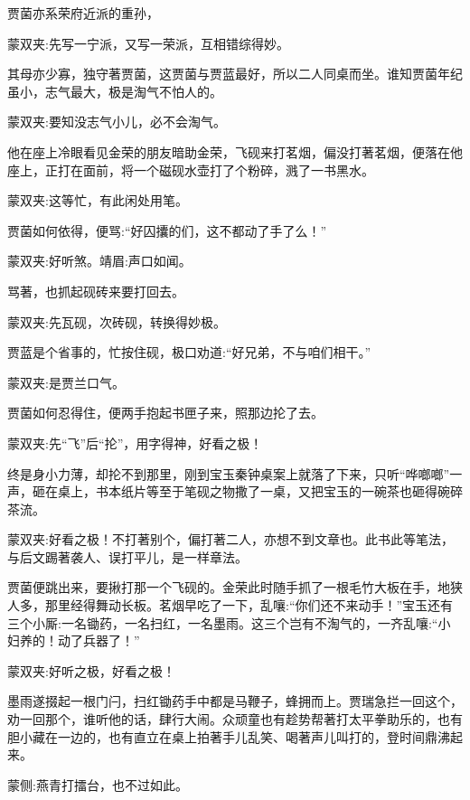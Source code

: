 \begin{parag}
    贾菌亦系荣府近派的重孙，\begin{note}蒙双夹:先写一宁派，又写一荣派，互相错综得妙。\end{note}其母亦少寡，独守著贾菌，这贾菌与贾蓝最好，所以二人同桌而坐。谁知贾菌年纪虽小，志气最大，极是淘气不怕人的。\begin{note}蒙双夹:要知没志气小儿，必不会淘气。\end{note}他在座上冷眼看见金荣的朋友暗助金荣，飞砚来打茗烟，偏没打著茗烟，便落在他座上，正打在面前，将一个磁砚水壶打了个粉碎，溅了一书黑水。\begin{note}蒙双夹:这等忙，有此闲处用笔。\end{note}贾菌如何依得，便骂:“好囚攮的们，这不都动了手了么！”\begin{note}蒙双夹:好听煞。靖眉:声口如闻。\end{note}骂著，也抓起砚砖来要打回去。\begin{note}蒙双夹:先瓦砚，次砖砚，转换得妙极。\end{note}贾蓝是个省事的，忙按住砚，极口劝道:“好兄弟，不与咱们相干。”\begin{note}蒙双夹:是贾兰口气。\end{note}贾菌如何忍得住，便两手抱起书匣子来，照那边抡了去。\begin{note}蒙双夹:先“飞”后“抡”，用字得神，好看之极！\end{note}终是身小力薄，却抡不到那里，刚到宝玉秦钟桌案上就落了下来，只听“哗啷啷”一声，砸在桌上，书本纸片等至于笔砚之物撒了一桌，又把宝玉的一碗茶也砸得碗碎茶流。\begin{note}蒙双夹:好看之极！不打著别个，偏打著二人，亦想不到文章也。此书此等笔法，与后文踢著袭人、误打平儿，是一样章法。\end{note}贾菌便跳出来，要揪打那一个飞砚的。金荣此时随手抓了一根毛竹大板在手，地狭人多，那里经得舞动长板。茗烟早吃了一下，乱嚷:“你们还不来动手！”宝玉还有三个小厮:一名锄药，一名扫红，一名墨雨。这三个岂有不淘气的，一齐乱嚷:“小妇养的！动了兵器了！”\begin{note}蒙双夹:好听之极，好看之极！\end{note}墨雨遂掇起一根门闩，扫红锄药手中都是马鞭子，蜂拥而上。贾瑞急拦一回这个，劝一回那个，谁听他的话，肆行大闹。众顽童也有趁势帮著打太平拳助乐的，也有胆小藏在一边的，也有直立在桌上拍著手儿乱笑、喝著声儿叫打的，登时间鼎沸起来。\begin{note}蒙侧:燕青打擂台，也不过如此。\end{note}
\end{parag}


